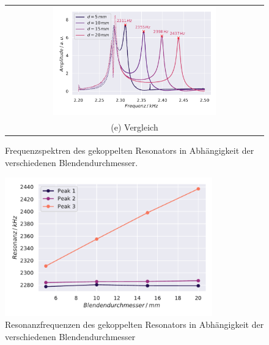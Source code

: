 \begin{figure}[H]
\begin{tabular}{cc}
  \multicolumn{2}{c}{\includegraphics[width=0.65\textwidth]{Daten/Wasserstoffmolekuelion/blendAbhaeng.pdf}}\\[6pt]
  \multicolumn{2}{c}{(e) Vergleich}
  \end{tabular}
  \caption{Frequenzspektren des gekoppelten Resonators in Abhängigkeit der verschiedenen Blendendurchmesser.} 
  \label{fig:h2}
\end{figure}
\begin{figure}[H]
  \centering
  \includegraphics[width=0.8\textwidth]{Daten/Wasserstoffmolekuelion/resonanzBlend.pdf}
  \caption{Resonanzfrequenzen des gekoppelten Resonators in Abhängigkeit der verschiedenen Blendendurchmesser}
  \label{fig:h2Res}
\end{figure}

